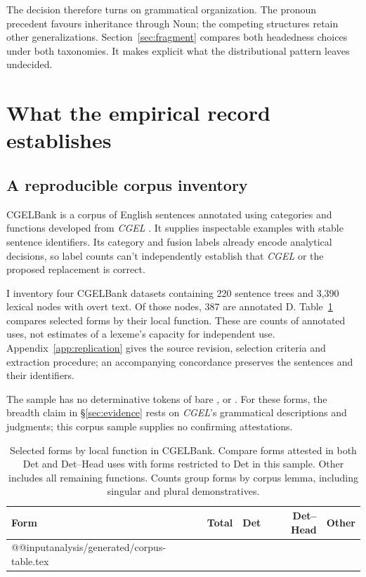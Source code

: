 \documentclass[12pt]{article}
\makeatletter
\newcommand{\tablebody}[1]{\csname @@input\endcsname #1 }
\makeatother
\begin{document}
The decision therefore turns on grammatical organization. The pronoun precedent favours inheritance through Noun; the competing structures retain other generalizations. Section~\ref{sec:fragment} compares both headedness choices under both taxonomies. It makes explicit what the distributional pattern leaves undecided.

\section{What the empirical record establishes}\label{sec:empirical}

\subsection{A reproducible corpus inventory}

CGELBank is a corpus of English sentences annotated using categories and functions developed from \textit{CGEL} \citep{reynolds2023unified}. It supplies inspectable examples with stable sentence identifiers. Its category and fusion labels already encode analytical decisions, so label counts can't independently establish that \textit{CGEL} or the proposed replacement is correct.

I inventory four CGELBank datasets containing 220 sentence trees and 3,390 lexical nodes with overt text. Of those nodes, 387 are annotated D. Table~\ref{tab:corpus} compares selected forms by their local function. These are counts of annotated uses, not estimates of a lexeme's capacity for independent use. Appendix~\ref{app:replication} gives the source revision, selection criteria and extraction procedure; an accompanying concordance preserves the sentences and their identifiers.

The sample has no determinative tokens of bare ,  or . For these forms, the breadth claim in §\ref{sec:evidence} rests on \textit{CGEL}'s grammatical descriptions and judgments; this corpus sample supplies no confirming attestations.

\begin{table}[tb]
\centering\small
\caption{Selected forms by local function in CGELBank. Compare forms attested in both Det and Det--Head uses with forms restricted to Det in this sample. Other includes all remaining functions. Counts group forms by corpus lemma, including singular and plural demonstratives.}\label{tab:corpus}
\begin{tabular}{lrrrr}
\toprule
Form & Total & Det & Det--Head & Other \\
\midrule
\tablebody{analysis/generated/corpus-table.tex}
\bottomrule
\end{tabular}
\end{table}
\end{document}
